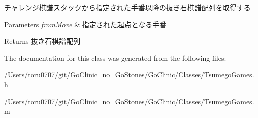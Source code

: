 \label{interface_tsumego_games_a1f08210c0c6886c19c1459d924f57c5c}
チャレンジ棋譜スタックから指定された手番以降の抜き石棋譜配列を取得する 
\begin{DoxyParams}{Parameters}
{\em fromMove} & 指定された起点となる手番 \\
\hline
\end{DoxyParams}
\begin{DoxyReturn}{Returns}
抜き石棋譜配列 
\end{DoxyReturn}


The documentation for this class was generated from the following files:\begin{DoxyCompactItemize}
\item 
/Users/toru0707/git/GoClinic\_\-no\_\-GoStones/GoClinic/Classes/TsumegoGames.h\item 
/Users/toru0707/git/GoClinic\_\-no\_\-GoStones/GoClinic/Classes/TsumegoGames.m\end{DoxyCompactItemize}
